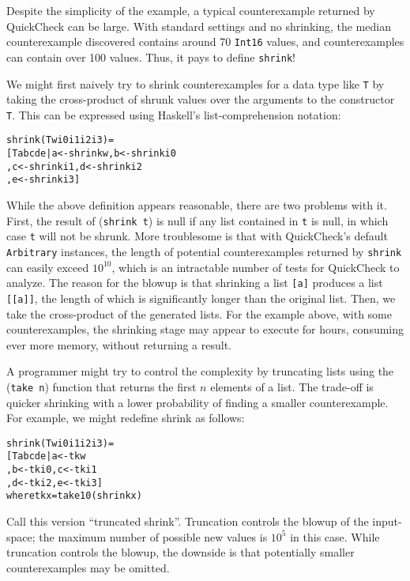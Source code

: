 \documentclass{sigplanconf}
\newenvironment{code}{\begin{alltt}}{\end{alltt}}
\newcommand{\ttp}[1]{\texttt{#1}}
\begin{document}
Despite the simplicity of the example, a typical counterexample returned by
QuickCheck can be large.  With standard settings and no shrinking, the median
counterexample discovered contains around 70 \ttp{Int16} values, and
counterexamples can contain over 100 values.   Thus, it pays to
define \ttp{shrink}!

We might first naively try to shrink counterexamples for a data type like
\ttp{T} by taking the cross-product of shrunk values over the arguments to the
constructor \ttp{T}.  This can be expressed using Haskell's list-comprehension
notation:
%
\begin{code}
shrink (T w i0 i1 i2 i3) =
  [ T a b c d e | a <- shrink w,  b <- shrink i0
                , c <- shrink i1, d <- shrink i2
                , e <- shrink i3 ]
\end{code}
%
\noindent
While the above definition appears reasonable, there are two problems with it.
First, the result of (\ttp{shrink t}) is null if any list contained in \ttp{t}
is null, in which case \ttp{t} will not be shrunk.  More troublesome is that with
QuickCheck's default \ttp{Arbitrary} instances, the length of potential
counterexamples returned by \ttp{shrink} can easily exceed $10^{10}$, which is
an intractable number of tests for QuickCheck to analyze.  The reason for the
blowup is that shrinking a list \ttp{[a]} produces a list \ttp{[[a]]}, the
length of which is significantly longer than the original list.  Then, we take
the cross-product of the generated lists.  For the example above, with some
counterexamples, the shrinking stage may appear to execute for hours, consuming
ever more memory, without returning a result.

A programmer might try to control the complexity by truncating lists using the
(\ttp{take n}) function that returns the first $n$ elements of a list.  The
trade-off is quicker shrinking with a lower probability of finding a smaller
counterexample.  For example, we might redefine shrink as follows:
%
\begin{samepage}
\begin{code}
shrink (T w i0 i1 i2 i3) =
  [ T a b c d e | a <- tk w
                , b <- tk i0, c <- tk i1
                , d <- tk i2, e <- tk i3 ]
  where tk x = take 10 (shrink x)
\end{code}
\end{samepage}
%
\noindent
Call this version ``truncated shrink''.  Truncation controls the blowup of the
input-space; the maximum number of possible new values is $10^5$ in this case.
While truncation controls the blowup, the downside is that potentially smaller
counterexamples may be omitted.
\end{document}
